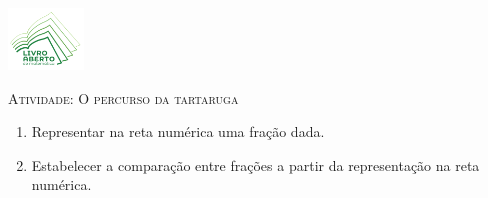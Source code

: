 \documentclass[10 pt,usenames,dvipsnames, oneside]{article}
\begin{document}
\begin{center}
  \begin{minipage}[l]{3cm}
\includegraphics[width=2cm]{../../../Figuras/logo}       
\end{minipage}\hfill
\begin{minipage}[r]{.8\textwidth}
 {\Large \scshape Atividade: O percurso da tartaruga}  
\end{minipage}
\end{center}
\vspace{.2cm}

\ifdefined\prof
\begin{goals}
\begin{enumerate}
\item Representar na reta numérica uma fração dada.
\item Estabelecer a comparação entre frações a partir da representação na reta numérica.
\end{enumerate}

\tcblower


\end{goals}
\end{document}
